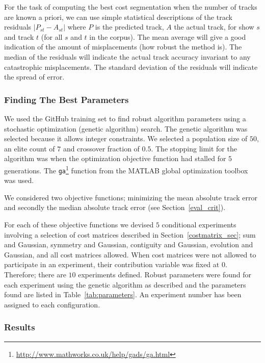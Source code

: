 \documentclass[twocolumn]{article}
\begin{document}
For the task of computing the best cost segmentation when the number of tracks are known a priori, we can use simple statistical descriptions of the track residuals $|P_{st}-A_{st}|$ where $P$ is the predicted track, $A$ the actual track, for show $s$ and track $t$ (for all $s$ and $t$ in the corpus). The mean average will give a good indication of the amount of misplacements (how robust the method is). The median of the residuals will indicate the actual track accuracy invariant to any catastrophic misplacements. The standard deviation of the residuals will indicate the spread of error. 

\subsubsection{Finding The Best Parameters}\label{sec:findingbestcostmatrix}

We used the GitHub training set to find robust algorithm parameters using a stochastic optimization (genetic algorithm) search. The genetic algorithm was selected because it allows integer constraints. We selected a population size of $50$, an elite count of $7$ and crossover fraction of $0.5$. The stopping limit for the algorithm was when the optimization objective function had stalled for $5$ generations. The \texttt{ga}\footnote{\url{http://www.mathworks.co.uk/help/gads/ga.html}} function from the MATLAB global optimization toolbox was used. 

We considered two objective functions; minimizing the mean absolute track error and secondly the median absolute track error (see Section~\ref{eval_crit}).

For each of these objective functions we devised $5$ conditional experiments involving a selection of cost matrices described in Section~\ref{costmatrix_sec}; sum and Gaussian, symmetry and Gaussian, contiguity and Gaussian, evolution and Gaussian, and all cost matrices allowed. When cost matrices were not allowed to participate in an experiment, their contribution variable was fixed at $0$. Therefore; there are $10$ experiments defined. Robust parameters were found for each experiment using the genetic algorithm as described and the parameters found are listed in Table~\ref{tab:parameters}. An experiment number has been assigned to each configuration.

\subsubsection{Results}\label{sec:results}
\end{document}
